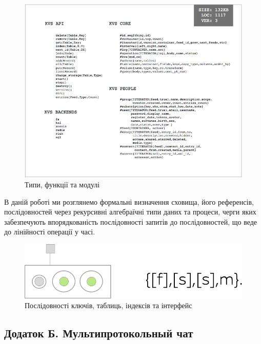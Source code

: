 \documentclass[11pt,oneside]{article}
\begin{document}
\begin{figure}[h!]
\centering
\includegraphics[scale=0.4]{img/exe-kvs-api}
\caption{Типи, функції та модулі}
\end{figure}

В даній роботі ми розглянемо формальні визначення сховища, його референсів, послідовностей через рекурсивні
алгебраїчні типи даних та процеси, черги яких забезпечують впорядкованість послідовності
запитів до послідовностей, що веде до лінійності операції у часі.

\begin{figure}[h!]
\centering
\includegraphics[scale=0.4]{img/exe-kvs}
\caption{Послідовності ключів, таблиць, індексів та інтерфейс}
\end{figure}

\newpage
\subsection{Додаток Б. Мультипротокольный чат}
\end{document}
